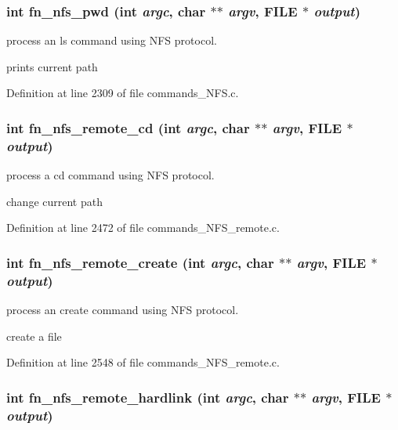 \subsubsection[{fn\_\-nfs\_\-pwd}]{\setlength{\rightskip}{0pt plus 5cm}int fn\_\-nfs\_\-pwd (int {\em argc}, \/  char $\ast$$\ast$ {\em argv}, \/  FILE $\ast$ {\em output})}\label{commands_8h_4a2c75d01a912e996f8f8e4fdbb02058}


process an ls command using NFS protocol.

prints current path 

Definition at line 2309 of file commands\_\-NFS.c.
\subsubsection[{fn\_\-nfs\_\-remote\_\-cd}]{\setlength{\rightskip}{0pt plus 5cm}int fn\_\-nfs\_\-remote\_\-cd (int {\em argc}, \/  char $\ast$$\ast$ {\em argv}, \/  FILE $\ast$ {\em output})}\label{commands_8h_a0c49cc5e2f8bb018f0404ad2df7c3cd}


process a cd command using NFS protocol.

change current path 

Definition at line 2472 of file commands\_\-NFS\_\-remote.c.
\subsubsection[{fn\_\-nfs\_\-remote\_\-create}]{\setlength{\rightskip}{0pt plus 5cm}int fn\_\-nfs\_\-remote\_\-create (int {\em argc}, \/  char $\ast$$\ast$ {\em argv}, \/  FILE $\ast$ {\em output})}\label{commands_8h_3ca2adfaec7b9f76ee58b05ed8eaee96}


process an create command using NFS protocol.

create a file 

Definition at line 2548 of file commands\_\-NFS\_\-remote.c.
\subsubsection[{fn\_\-nfs\_\-remote\_\-hardlink}]{\setlength{\rightskip}{0pt plus 5cm}int fn\_\-nfs\_\-remote\_\-hardlink (int {\em argc}, \/  char $\ast$$\ast$ {\em argv}, \/  FILE $\ast$ {\em output})}\label{commands_8h_d279971191c169cab4a91142e7346a68}


